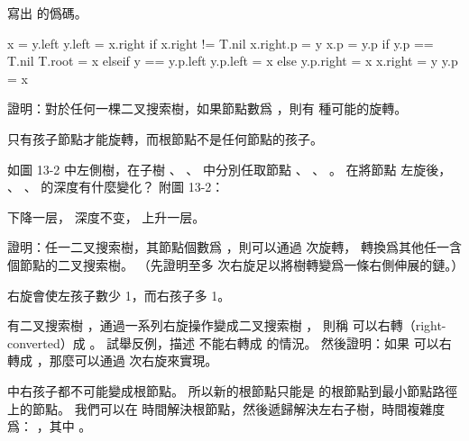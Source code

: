 \startsection[
  title={Rotations},
]

\startEXERCISE
寫出  的僞碼。
\stopEXERCISE

\startANSWER
{}
\startCLRS
x = y.left
y.left = x.right
if x.right != T.nil
	x.right.p = y
x.p = y.p
if y.p == T.nil
	T.root = x
elseif y == y.p.left
	y.p.left = x
else y.p.right = x
x.right = y
y.p = x
\stopCLRS
\stopANSWER

\startEXERCISE
證明：對於任何一棵二叉搜索樹，如果節點數爲 ，則有  種可能的旋轉。
\stopEXERCISE

\startANSWER
只有孩子節點才能旋轉，而根節點不是任何節點的孩子。
\stopANSWER

\startEXERCISE
如圖 13-2 中左側樹，在子樹 \m{\alpha}、 \m{\beta}、 \m{\gamma} 中分別任取節點 、 、 。
在將節點  左旋後， 、 、  的深度有什麼變化？ 附圖 13-2：

\externalfigure[output/e13_2_3-1]
\stopEXERCISE

\startANSWER
\m{\alpha} 下降一层， \m{\beta} 深度不变， \m{\gamma} 上升一层。
\stopANSWER

\startEXERCISE
證明：任一二叉搜索樹，其節點個數爲 ，則可以通過  次旋轉，
轉換爲其他任一含  個節點的二叉搜索樹。
（\hint 先證明至多  次右旋足以將樹轉變爲一條右側伸展的鏈。）
\stopEXERCISE

\startANSWER
右旋會使左孩子數少 1，而右孩子多 1。
\stopANSWER

\startEXERCISE
有二叉搜索樹 ，通過一系列右旋操作變成二叉搜索樹 ，
則稱  可以{\EMP 右轉（right-converted）}成 。
試舉反例，描述  不能右轉成  的情況。
然後證明：如果  可以右轉成 ，那麼可以通過  次右旋來實現。
\stopEXERCISE

\startANSWER
\externalfigure[output/e13_2_5-1]
\externalfigure[output/e13_2_5-2]

 中右孩子都不可能變成根節點。
所以新的根節點只能是  的根節點到最小節點路徑上的節點。
我們可以在  時間解決根節點，然後遞歸解決左右子樹，時間複雜度爲：
，其中 。
\stopANSWER

\stopsection
